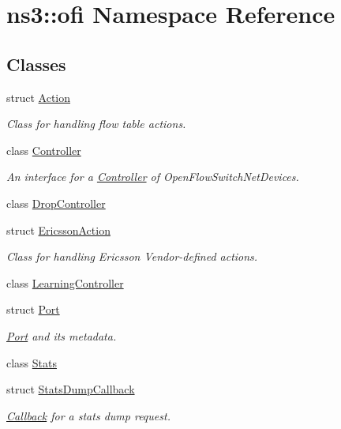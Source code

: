 \hypertarget{namespacens3_1_1ofi}{}\section{ns3\+:\+:ofi Namespace Reference}
\label{namespacens3_1_1ofi}
\subsection*{Classes}
\begin{DoxyCompactItemize}
\item 
struct \hyperlink{structns3_1_1ofi_1_1Action}{Action}
\begin{DoxyCompactList}\small\item\em Class for handling flow table actions. \end{DoxyCompactList}\item 
class \hyperlink{classns3_1_1ofi_1_1Controller}{Controller}
\begin{DoxyCompactList}\small\item\em An interface for a \hyperlink{classns3_1_1ofi_1_1Controller}{Controller} of Open\+Flow\+Switch\+Net\+Devices. \end{DoxyCompactList}\item 
class \hyperlink{classns3_1_1ofi_1_1DropController}{Drop\+Controller}
\item 
struct \hyperlink{structns3_1_1ofi_1_1EricssonAction}{Ericsson\+Action}
\begin{DoxyCompactList}\small\item\em Class for handling Ericsson Vendor-\/defined actions. \end{DoxyCompactList}\item 
class \hyperlink{classns3_1_1ofi_1_1LearningController}{Learning\+Controller}
\item 
struct \hyperlink{structns3_1_1ofi_1_1Port}{Port}
\begin{DoxyCompactList}\small\item\em \hyperlink{structns3_1_1ofi_1_1Port}{Port} and its metadata. \end{DoxyCompactList}\item 
class \hyperlink{classns3_1_1ofi_1_1Stats}{Stats}
\item 
struct \hyperlink{structns3_1_1ofi_1_1StatsDumpCallback}{Stats\+Dump\+Callback}
\begin{DoxyCompactList}\small\item\em \hyperlink{classns3_1_1Callback}{Callback} for a stats dump request. \end{DoxyCompactList}\item 

\end{DoxyCompactItemize}
